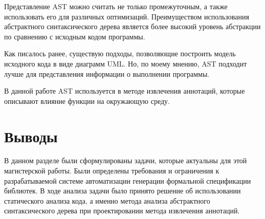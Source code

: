 Представление AST можно считать не только промежуточным, а также использовать его для различных оптимизаций. Преимуществом использования абстрактного синтаксического дерева является более высокий уровень абстракции по сравнению с исходным кодом программы.

Как писалось ранее, существую подходы, позволяющие построить модель исходного кода в виде диаграмм UML. Но, по моему мнению, AST подходит лучше для представления информации о выполнении программы.

В данной работе AST используется в методе извлечения аннотаций, которые описывают влияние функции на окружающую среду.

\section{Выводы}

В данном разделе были сформулированы задачи, которые актуальны для этой магистерской работы. Были определены требования и ограничения к разрабатываемой системе автоматизации генерации формальной спецификации библиотек.
В ходе анализа задачи было принято решение об использовании статического анализа кода, а именно метода анализа абстрактного синтаксического дерева при проектировании метода извлечения аннотаций.